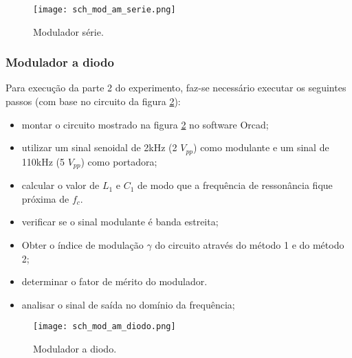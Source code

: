 \begin{figure}[H]
    \centering
    \caption{Modulador série.}
    \texttt{[image: sch\_mod\_am\_serie.png]}
    \label{f_sch_mod_am_serie}
\end{figure}

\subsubsection{Modulador a diodo}
Para execução da parte 2 do experimento, faz-se necessário executar os seguintes passos (com base no circuito da figura \ref{f_sch_mod_am_diodo}):

\begin{itemize}
    \item montar o circuito mostrado na figura \ref{f_sch_mod_am_diodo} no software Orcad;
    \item utilizar um sinal senoidal de 2kHz (2 $V_{pp}$) como modulante e um sinal de 110kHz (5 $V_{pp}$) como portadora;
    \item calcular o valor de $L_1$ e $C_1$ de modo que a frequência de ressonância fique próxima de $f_c$.
    \item verificar se o sinal modulante é banda estreita;
    \item Obter o índice de modulação $\gamma$ do circuito através do método 1 e do método 2;
    \item determinar o fator de mérito do modulador.
    \item analisar o sinal de saída no domínio da frequência;
\end{itemize}

\begin{figure}[H]
    \centering
    \caption{Modulador a diodo.}
    \texttt{[image: sch\_mod\_am\_diodo.png]}
    \label{f_sch_mod_am_diodo}
\end{figure}
